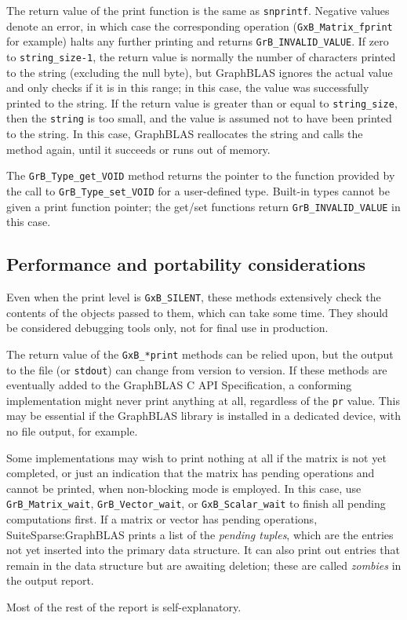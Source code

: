 The return value of the print function is the same as \verb'snprintf'.
Negative values denote an error, in which case the corresponding operation
(\verb'GxB_Matrix_fprint' for example) halts any further printing and returns
\verb'GrB_INVALID_VALUE'.  If zero to \verb'string_size-1', the return value is
normally the number of characters printed to the string (excluding the null
byte), but GraphBLAS ignores the actual value and only checks if it is in this
range; in this case, the value was successfully printed to the string.  If the
return value is greater than or equal to \verb'string_size', then the
\verb'string' is too small, and the value is assumed not to have been printed
to the string.  In this case, GraphBLAS reallocates the string and calls the
method again, until it succeeds or runs out of memory.

The \verb'GrB_Type_get_VOID' method returns the pointer to the function
provided by the call to \verb'GrB_Type_set_VOID' for a user-defined type.
Built-in types cannot be given a print function pointer; the get/set functions
return \verb'GrB_INVALID_VALUE' in this case.

\subsection{Performance and portability considerations}

Even when the print level is \verb'GxB_SILENT', these methods extensively check
the contents of the objects passed to them, which can take some time.  They
should be considered debugging tools only, not for final use in production.

The return value of the \verb'GxB_*print' methods can be relied upon, but the
output to the file (or \verb'stdout') can change from version to version.  If
these methods are eventually added to the GraphBLAS C API Specification, a
conforming implementation might never print anything at all, regardless of the
\verb'pr' value.  This may be essential if the GraphBLAS library is installed
in a dedicated device, with no file output, for example.

Some implementations may wish to print nothing at all if the matrix is not yet
completed, or just an indication that the matrix has pending operations and
cannot be printed, when non-blocking mode is employed.  In this case, use
\verb'GrB_Matrix_wait', \verb'GrB_Vector_wait', or \verb'GxB_Scalar_wait' to
finish all pending computations first.  If a matrix or vector has pending
operations, SuiteSparse:GraphBLAS prints a list of the {\em pending tuples},
which are the entries not yet inserted into the primary data structure.  It can
also print out entries that remain in the data structure but are awaiting
deletion; these are called {\em zombies} in the output report.

Most of the rest of the report is self-explanatory.

